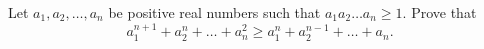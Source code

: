 Let $a_1,a_2,\ldots,a_n$ be positive real numbers such that $a_1a_2\ldots a_n\geq1$. Prove that \[a_1^{n+1}+a_2^n+\ldots+a_n^2\geq a_1^n+a_2^{n-1}+\ldots+a_n.\]